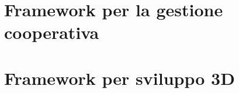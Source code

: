 \section{Framework per la gestione cooperativa}\label{sec:Cooperativa}

\section{Framework per sviluppo 3D}\label{sec:FW3D}